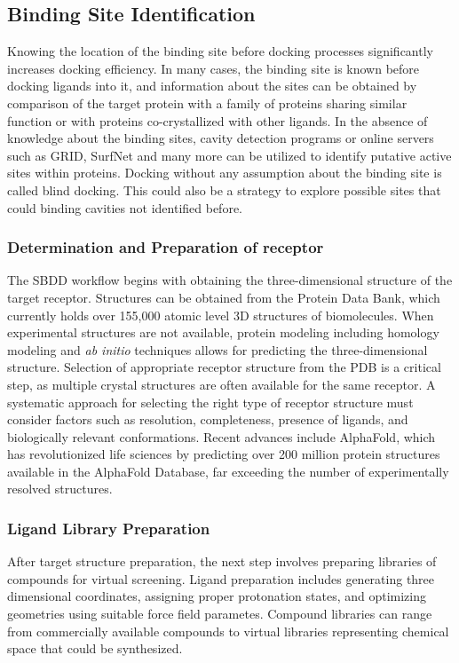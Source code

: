\subsection{Binding Site Identification}
Knowing the location of the binding site before docking processes significantly increases docking efficiency. In many cases, the binding site is known before docking ligands into it, and information about the sites can be obtained by comparison of the target protein with a family of proteins sharing similar function or with proteins co-crystallized with other ligands. In the absence of knowledge about the binding sites, cavity detection programs or online servers such as GRID\cite{CH1_16}, SurfNet\cite{CH1_16} and many more can be utilized to identify putative active sites within proteins. Docking without any assumption about the binding site is called blind docking. This could also be a strategy to explore possible sites that could binding cavities not identified before. 

\subsubsection{Determination and Preparation of receptor}
The SBDD workflow begins with obtaining the three-dimensional structure of the target receptor. Structures can be obtained from the Protein Data Bank, which currently holds over 155,000 atomic level 3D structures of biomolecules. When experimental structures are not available, protein modeling including homology modeling and \textit{ab initio} techniques allows for predicting the three-dimensional structure. Selection of appropriate receptor structure from the PDB is a critical step, as multiple crystal structures are often available for the same receptor. A systematic approach for selecting the right type of receptor structure must consider factors such as resolution, completeness, presence of ligands, and biologically relevant conformations. Recent advances include AlphaFold\cite{CH1_15}, which has revolutionized life sciences by predicting over 200 million protein structures available in the AlphaFold Database, far exceeding the number of experimentally resolved structures.

\subsubsection{Ligand Library Preparation}
After target structure preparation, the next step involves preparing libraries of compounds for virtual screening. Ligand preparation includes generating three dimensional coordinates, assigning proper protonation states, and optimizing geometries using suitable force field parametes. Compound libraries can range from commercially available compounds to virtual libraries representing chemical space that could be synthesized.

